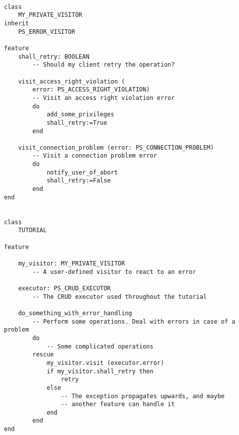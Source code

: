 \begin{lstlisting}[language=OOSC2Eiffel, captionpos=b, caption={}, label={lst:error_visitor_example}]

class
	MY_PRIVATE_VISITOR
inherit
	PS_ERROR_VISITOR

feature
	shall_retry: BOOLEAN
		-- Should my client retry the operation?

	visit_access_right_violation (
		error: PS_ACCESS_RIGHT_VIOLATION)
		-- Visit an access right violation error
		do
			add_some_privileges
			shall_retry:=True
		end

	visit_connection_problem (error: PS_CONNECTION_PROBLEM)
		-- Visit a connection problem error
		do
			notify_user_of_abort
			shall_retry:=False
		end
end


class
	TUTORIAL

feature

	my_visitor: MY_PRIVATE_VISITOR
		-- A user-defined visitor to react to an error

	executor: PS_CRUD_EXECUTOR
		-- The CRUD executor used throughout the tutorial

	do_something_with_error_handling
		-- Perform some operations. Deal with errors in case of a problem
		do
			-- Some complicated operations
		rescue
			my_visitor.visit (executor.error)
			if my_visitor.shall_retry then
				retry
			else
				-- The exception propagates upwards, and maybe
				-- another feature can handle it
			end
		end
end

\end{lstlisting}




